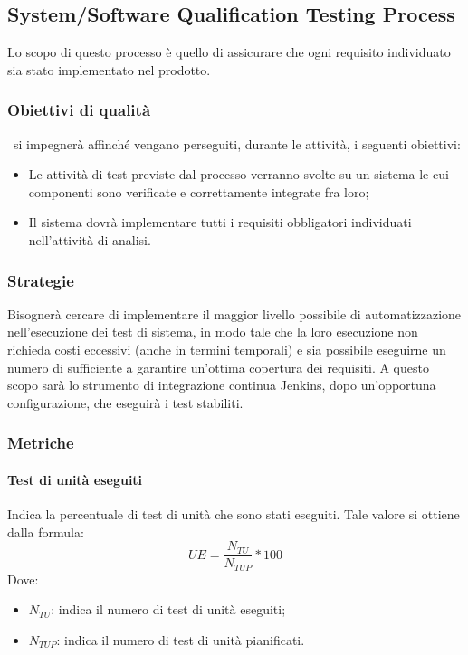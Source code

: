 \documentclass[../PianoDiQualifica.tex]{subfiles}
\begin{document}
		
		\subsection{System/Software Qualification Testing Process}
		Lo scopo di questo processo è quello di assicurare che ogni requisito individuato sia stato implementato nel prodotto.
			
			\subsubsection{Obiettivi di qualità}
			\kpanic\ si impegnerà affinché vengano perseguiti, durante le attività, i seguenti obiettivi:
			\begin{itemize}
				\item Le attività di test previste dal processo verranno svolte su un sistema le cui componenti sono verificate e correttamente integrate fra loro;
				\item Il sistema dovrà implementare tutti i requisiti obbligatori individuati nell'attività di analisi.
			\end{itemize}
			
			\subsubsection{Strategie}
			Bisognerà cercare di implementare il maggior livello possibile di automatizzazione nell'esecuzione dei test di sistema, in modo tale che la loro esecuzione non richieda costi eccessivi (anche in termini temporali) e sia possibile eseguirne un numero di sufficiente a garantire un'ottima copertura dei requisiti. A questo scopo sarà lo strumento di integrazione continua Jenkins, dopo un'opportuna configurazione, che eseguirà i test stabiliti.
			
			\subsubsection{Metriche}
			\paragraph{Test di unità eseguiti}
				Indica la percentuale di test di unità che sono stati eseguiti.
				Tale valore si ottiene dalla formula:
				\begin{equation*}
					UE = \frac{N_{TU}}{N_{TUP}} * 100
				\end{equation*}
				Dove:
				\begin{itemize}
					\item \textbf{$N_{TU}$}: indica il numero di test di unità eseguiti;
					\item \textbf{$N_{TUP}$}: indica il numero di test di unità pianificati.
				\end{itemize}
				
\end{document}
